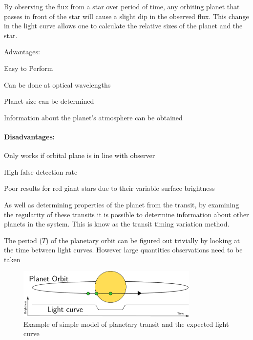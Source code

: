 By observing the flux from a star over period of time, any orbiting planet that passes in front of the star will cause a slight dip in the observed flux. This change in the light curve allows one to calculate the relative sizes of the planet and the star.

Advantages:
\begin{itemize*}
    \item Easy to Perform
    \item Can be done at optical wavelengths
    \item Planet size can be determined
    \item Information about the planet's atmosphere can be obtained \citep{fortney2006atmosphere}
\end{itemize*}

\paragraph{Disadvantages:}
\begin{itemize*}
    \item Only works if orbital plane is in line with observer
    \item High false detection rate \citep{santerne2012sophie}
    \item Poor results for red giant stars due to their variable surface brightness
\end{itemize*}

As well as determining properties of the planet from the transit, by examining the regularity of these transits it is possible to determine information about other planets in the system. This is know as the transit timing variation method.

The period ($T$) of the planetary orbit can be figured out trivially by looking at the time between light curves. However large quantities observations need to be taken

\begin{figure}[\here]
    \centering
    \includegraphics[width=0.8\textwidth]{images/planetary_transit.pdf}
    \caption{Example of simple model of planetary transit and the expected light curve}
    \label{fig:transit}
\end{figure}

